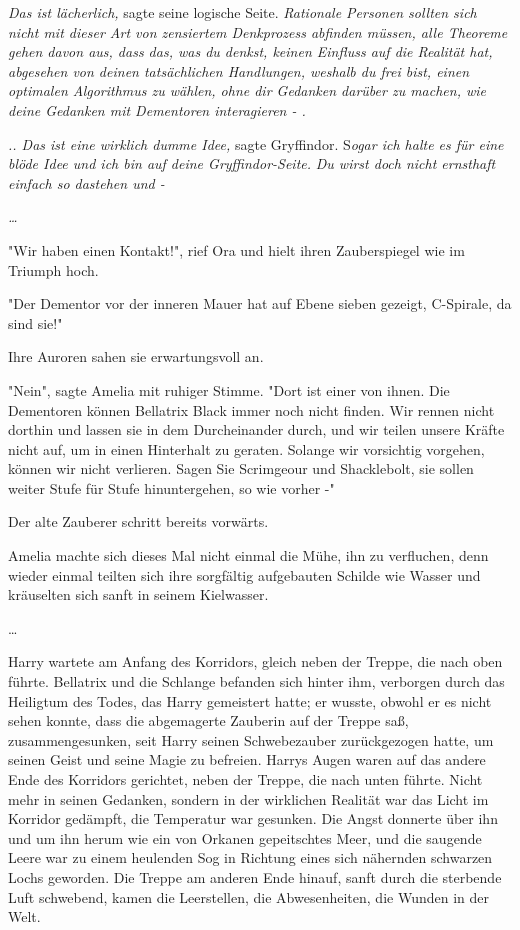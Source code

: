 {\emph{Das ist lächerlich,} sagte seine logische Seite. \emph{Rationale Personen sollten sich nicht mit dieser Art von zensiertem Denkprozess abfinden müssen, alle Theoreme gehen davon aus, dass das, was du denkst, keinen Einfluss auf die Realität hat, abgesehen von deinen tatsächlichen Handlungen, weshalb du frei bist, einen optimalen Algorithmus zu wählen, ohne dir Gedanken darüber zu machen, wie deine Gedanken mit Dementoren interagieren - .}

\emph{.. Das ist eine wirklich dumme Idee,} sagte Gryffindor. S\emph{ogar ich halte es für eine} \emph{blöde Idee und ich bin auf deine Gryffindor-Seite.} \emph{Du wirst doch nicht ernsthaft einfach so dastehen und -}

\emph{…}

"Wir haben einen Kontakt!", rief Ora und hielt ihren Zauberspiegel wie im Triumph hoch.

"Der Dementor vor der inneren Mauer hat auf Ebene sieben gezeigt, C-Spirale, da sind sie!"

Ihre Auroren sahen sie erwartungsvoll an.

"Nein", sagte Amelia mit ruhiger Stimme. "Dort ist einer von ihnen. Die Dementoren können Bellatrix Black immer noch nicht finden. Wir rennen nicht dorthin und lassen sie in dem Durcheinander durch, und wir teilen unsere Kräfte nicht auf, um in einen Hinterhalt zu geraten. Solange wir vorsichtig vorgehen, können wir nicht verlieren. Sagen Sie Scrimgeour und Shacklebolt, sie sollen weiter Stufe für Stufe hinuntergehen, so wie vorher -"

Der alte Zauberer schritt bereits vorwärts.

Amelia machte sich dieses Mal nicht einmal die Mühe, ihn zu verfluchen, denn wieder einmal teilten sich ihre sorgfältig aufgebauten Schilde wie Wasser und kräuselten sich sanft in seinem Kielwasser.

…

Harry wartete am Anfang des Korridors, gleich neben der Treppe, die nach oben führte. Bellatrix und die Schlange befanden sich hinter ihm, verborgen durch das Heiligtum des Todes, das Harry gemeistert hatte; er wusste, obwohl er es nicht sehen konnte, dass die abgemagerte Zauberin auf der Treppe saß, zusammengesunken, seit Harry seinen Schwebezauber zurückgezogen hatte, um seinen Geist und seine Magie zu befreien. Harrys Augen waren auf das andere Ende des Korridors gerichtet, neben der Treppe, die nach unten führte. Nicht mehr in seinen Gedanken, sondern in der wirklichen Realität war das Licht im Korridor gedämpft, die Temperatur war gesunken. Die Angst donnerte über ihn und um ihn herum wie ein von Orkanen gepeitschtes Meer, und die saugende Leere war zu einem heulenden Sog in Richtung eines sich nähernden schwarzen Lochs geworden. Die Treppe am anderen Ende hinauf, sanft durch die sterbende Luft schwebend, kamen die Leerstellen, die Abwesenheiten, die Wunden in der Welt.

}

